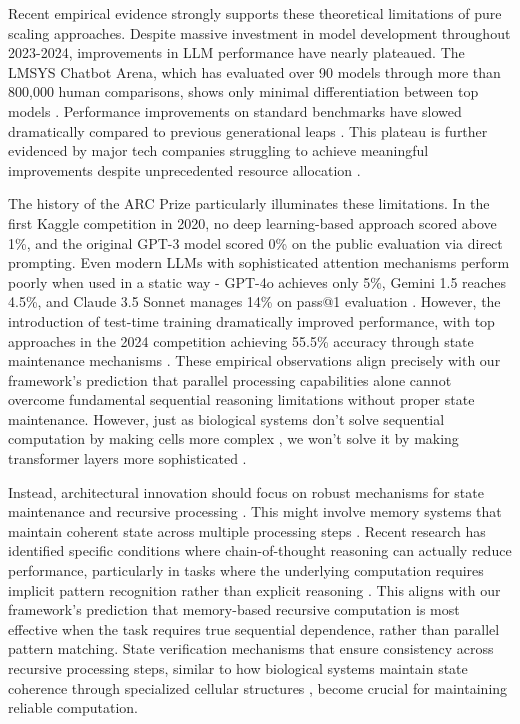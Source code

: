 \documentclass[12pt]{article}
\begin{document}
Recent empirical evidence strongly supports these theoretical limitations of pure scaling approaches.
Despite massive investment in model development throughout 2023-2024, improvements in LLM performance have nearly plateaued.
The LMSYS Chatbot Arena, which has evaluated over 90 models through more than 800,000 human comparisons, shows only minimal differentiation between top models \cite{lmsys2024arena}.
Performance improvements on standard benchmarks have slowed dramatically compared to previous generational leaps \cite{marcus2024evidence}.
This plateau is further evidenced by major tech companies struggling to achieve meaningful improvements despite unprecedented resource allocation \cite{zuo2024plateau}.

The history of the ARC Prize particularly illuminates these limitations.
In the first Kaggle competition in 2020, no deep learning-based approach scored above 1\%, and the original GPT-3 model scored 0\% on the public evaluation via direct prompting.
Even modern LLMs with sophisticated attention mechanisms perform poorly when used in a static way - GPT-4o achieves only 5\%, Gemini 1.5 reaches 4.5\%, and Claude 3.5 Sonnet manages 14\% on pass@1 evaluation \cite{chollet2024arc}.
However, the introduction of test-time training dramatically improved performance, with top approaches in the 2024 competition achieving 55.5\% accuracy through state maintenance mechanisms \cite{chollet2024arc}.
These empirical observations align precisely with our framework's prediction that parallel processing capabilities alone cannot overcome fundamental sequential reasoning limitations without proper state maintenance.
However, just as biological systems don't solve sequential computation by making cells more complex \cite{wang2023parallel}, we won't solve it by making transformer layers more sophisticated \cite{zhao2024epha}.

Instead, architectural innovation should focus on robust mechanisms for state maintenance and recursive processing \cite{jung2020new}.
This might involve memory systems that maintain coherent state across multiple processing steps \cite{zhu2024overcoming}.
Recent research has identified specific conditions where chain-of-thought reasoning can actually reduce performance, particularly in tasks where the underlying computation requires implicit pattern recognition rather than explicit reasoning \cite{liu2024mind}.
This aligns with our framework's prediction that memory-based recursive computation is most effective when the task requires true sequential dependence, rather than parallel pattern matching.
State verification mechanisms that ensure consistency across recursive processing steps, similar to how biological systems maintain state coherence through specialized cellular structures \cite{espinosa2024molecular}, become crucial for maintaining reliable computation.
\end{document}
